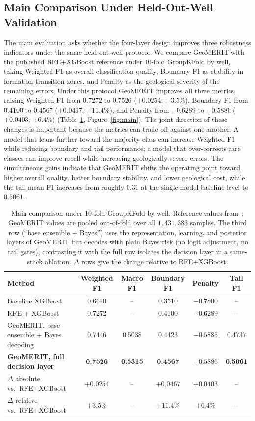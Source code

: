 \documentclass[bdcc,article,submit,pdftex,moreauthors]{Definitions/mdpi}
\begin{document}
\subsection{Main Comparison Under Held-Out-Well Validation}
\label{sec:rq1}
The main evaluation asks whether the four-layer design improves three robustness indicators
under the same held-out-well protocol. We compare GeoMERIT with the published RFE+XGBoost
reference under 10-fold GroupKFold by well, taking Weighted F1 as overall classification
quality, Boundary F1 as stability in formation-transition zones, and Penalty as the geological
severity of the remaining errors. Under this protocol GeoMERIT improves all three metrics,
raising Weighted F1 from $0.7272$ to $0.7526$ ($+0.0254$; $+3.5\%$), Boundary F1 from
$0.4100$ to $0.4567$ ($+0.0467$; $+11.4\%$), and Penalty from $-0.6289$ to $-0.5886$
($+0.0403$; $+6.4\%$) (Table~\ref{tab:main}, Figure~\ref{fig:main}). The joint direction of
these changes is important because the metrics can trade off against one another. A model that
leans further toward the majority class can increase Weighted F1 while reducing boundary and
tail performance; a model that over-corrects rare classes can improve recall while increasing
geologically severe errors. The simultaneous gains indicate that GeoMERIT shifts the operating
point toward higher overall quality, better boundary stability, and lower geological cost, while
the tail mean F1 increases from roughly $0.31$ at the single-model baseline level to $0.5061$.

\begin{table}[H]
\caption{Main comparison under 10-fold GroupKFold by well. Reference values from~\cite{chen2026rfe};
GeoMERIT values are pooled out-of-fold over all $1{,}431{,}383$ samples. The third row
(``base ensemble $+$ Bayes'') uses the representation, learning, and posterior layers of
GeoMERIT but decodes with plain Bayes risk (no logit adjustment, no tail gates); contrasting
it with the full row isolates the decision layer in a same-stack ablation. $\Delta$ rows give
the change relative to RFE+XGBoost.\label{tab:main}}
\begin{tabularx}{\textwidth}{Xccccc}
\toprule
\textbf{Method} & \textbf{Weighted F1} & \textbf{Macro F1} & \textbf{Boundary F1} & \textbf{Penalty} & \textbf{Tail F1}\\
\midrule
Baseline XGBoost~\cite{chen2026rfe} & 0.6640 & -- & 0.3510 & $-0.7800$ & --\\
RFE + XGBoost~\cite{chen2026rfe} & 0.7272 & -- & 0.4100 & $-0.6289$ & --\\
GeoMERIT, base ensemble + Bayes decoding & 0.7446 & 0.5038 & 0.4423 & $-0.5885$ & 0.4737\\
\textbf{GeoMERIT, full decision layer} & \textbf{0.7526} & \textbf{0.5315} & \textbf{0.4567} & $\mathbf{-0.5886}$ & \textbf{0.5061}\\
\midrule
$\Delta$ absolute vs.\ RFE+XGBoost & $+0.0254$ & -- & $+0.0467$ & $+0.0403$ & --\\
$\Delta$ relative vs.\ RFE+XGBoost & $+3.5\%$ & -- & $+11.4\%$ & $+6.4\%$ & --\\
\bottomrule
\end{tabularx}
\end{table}
\end{document}
